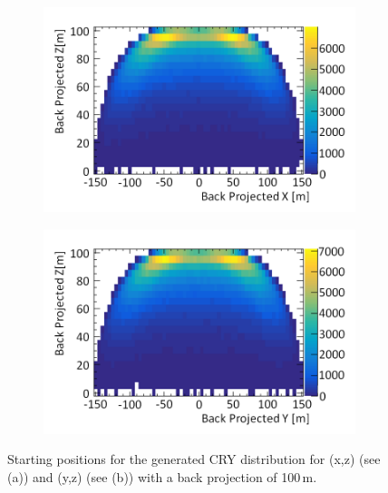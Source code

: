 \begin{figure}[!h]
\centering
\begin{subfigure}{.5\textwidth}
  \centering
  \includegraphics[width=\linewidth]{Chapter4/Figs/Raster/CryPlots/BackProjectionXZMedText.png}
  \captionsetup{width=.9\linewidth}
  \caption{}
  \label{subFig:BackProjectionXZ}
\end{subfigure}%
\begin{subfigure}{.5\textwidth}
  \centering
  \includegraphics[width=\linewidth]{Chapter4/Figs/Raster/CryPlots/BackProjectionYZMedText.png}
  \captionsetup{width=.9\linewidth}
  \caption{}
  \label{subFig:BackProjectionYZ}
\end{subfigure}
\caption{Starting positions for the generated CRY distribution for (x,z) (see (a)) and (y,z) (see (b)) with a back projection of 100\,m.}
\label{fig:BackProjection_XZ_YZ}
\end{figure}


